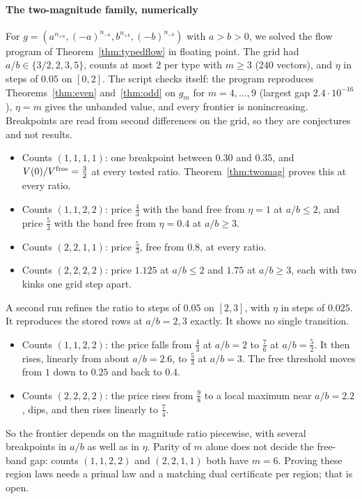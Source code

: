 \paragraph{The two-magnitude family, numerically}
For $g=(a^{n_{+a}},(-a)^{n_{-a}},b^{n_{+b}},(-b)^{n_{-b}})$ with $a>b>0$, we solved the flow
program of Theorem~\ref{thm:typedflow} in floating point. The grid had $a/b\in\{3/2,2,3,5\}$,
counts at most $2$ per type with $m\ge3$ ($240$ vectors), and $\eta$ in steps of $0.05$ on
$[0,2]$. The script checks itself: the program reproduces Theorems~\ref{thm:even}
and~\ref{thm:odd} on $g_m$ for $m=4,\dots,9$ (largest gap $2.4\cdot10^{-16}$), $\eta=m$ gives the
unbanded value, and every frontier is nonincreasing. Breakpoints are read from second
differences on the grid, so they are conjectures and not results. \NUM{}
\begin{itemize}
\item Counts $(1,1,1,1)$: one breakpoint between $0.30$ and $0.35$, and
$V(0)/V^{\rm free}=\frac32$ at every tested ratio. Theorem~\ref{thm:twomag} proves this at
every ratio.
\item Counts $(1,1,2,2)$: price $\frac43$ with the band free from $\eta=1$ at $a/b\le2$, and
price $\frac53$ with the band free from $\eta=0.4$ at $a/b\ge3$.
\item Counts $(2,2,1,1)$: price $\frac53$, free from $0.8$, at every ratio.
\item Counts $(2,2,2,2)$: price $1.125$ at $a/b\le2$ and $1.75$ at $a/b\ge3$, each with two
kinks one grid step apart.
\end{itemize}
A second run refines the ratio to steps of $0.05$ on $[2,3]$, with $\eta$ in steps of
$0.025$. It reproduces the stored rows at $a/b=2,3$ exactly. It shows no single transition.
\NUM{}
\begin{itemize}
\item Counts $(1,1,2,2)$: the price falls from $\frac43$ at $a/b=2$ to $\frac76$ at $a/b=\frac52$.
It then rises, linearly from about $a/b=2.6$, to $\frac53$ at $a/b=3$. The free threshold moves
from $1$ down to $0.25$ and back to $0.4$.
\item Counts $(2,2,2,2)$: the price rises from $\frac98$ to a local maximum near $a/b=2.2$,
dips, and then rises linearly to $\frac74$.
\end{itemize}
So the frontier depends on the magnitude ratio piecewise, with several breakpoints in $a/b$ as
well as in $\eta$. Parity of $m$ alone does not decide the free-band gap: counts $(1,1,2,2)$ and
$(2,2,1,1)$ both have $m=6$. Proving these region laws needs a primal law and a matching dual
certificate per region; that is open.

